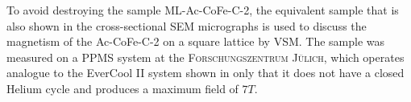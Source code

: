 \documentclass[\main/dresen_thesis.tex]{subfiles}
\begin{document}




    
    To avoid destroying the sample ML-Ac-CoFe-C-2, the equivalent sample that is also shown in the cross-sectional SEM micrographs is used to discuss the magnetism of the Ac-CoFe-C-2 on a square lattice by VSM.
    The sample was measured on a PPMS system at the \textsc{Forschungszentrum J\"ulich}, which operates analogue to the EverCool II system shown in  only that it does not have a closed Helium cycle and produces a maximum field of $7 \unit{T}$.
\end{document}

